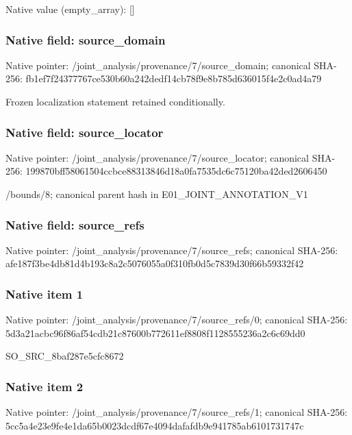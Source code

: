 \documentclass[10pt,a4paper]{article}
\begin{document}
Native value (empty\_\allowbreak{}array): []

\subsubsection{Native field: source\_\allowbreak{}domain}
Native pointer: /joint\_\allowbreak{}analysis/provenance/7/source\_\allowbreak{}domain; canonical SHA-256: fb1ef7f24377767ce530b60a242dedf14cb78f9e8b785d636015f4e2c0ad4a79

\begingroup\raggedright\sloppy Frozen localization statement retained conditionally.\par\endgroup

\subsubsection{Native field: source\_\allowbreak{}locator}
Native pointer: /joint\_\allowbreak{}analysis/provenance/7/source\_\allowbreak{}locator; canonical SHA-256: 199870bff58061504ccbce88313846d18a0fa7535dc6c75120ba42ded2606450

\begingroup\raggedright\sloppy /\allowbreak{}bounds/\allowbreak{}8;\allowbreak{} canonical parent hash in E01\_\allowbreak{}JOINT\_\allowbreak{}ANNOTATION\_\allowbreak{}V1\par\endgroup

\subsubsection{Native field: source\_\allowbreak{}refs}
Native pointer: /joint\_\allowbreak{}analysis/provenance/7/source\_\allowbreak{}refs; canonical SHA-256: afe187f3be4db81d4b193c8a2c5076055a0f310fb0d5c7839d30f66b59332f42

\subsubsection{Native item 1}
Native pointer: /joint\_\allowbreak{}analysis/provenance/7/source\_\allowbreak{}refs/0; canonical SHA-256: 5d3a21acbc96f86af54cdb21c87600b772611ef8808f1128555236a2c6c69dd0

\begingroup\raggedright\sloppy SO\_\allowbreak{}SRC\_\allowbreak{}8baf287e5cfc8672\par\endgroup

\subsubsection{Native item 2}
Native pointer: /joint\_\allowbreak{}analysis/provenance/7/source\_\allowbreak{}refs/1; canonical SHA-256: 5cc5a4e23e9fe4e1da65b0023dcdf67e4094dafafdb9e941785ab6101731747c
\end{document}
